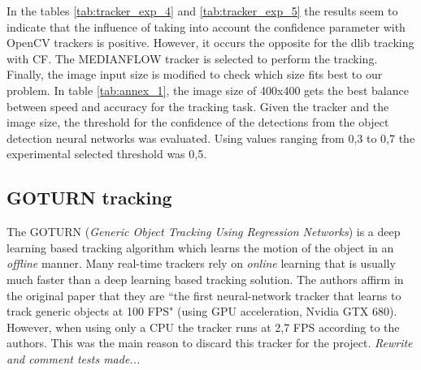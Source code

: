 In the tables \ref{tab:tracker_exp_4} and \ref{tab:tracker_exp_5} the results seem to indicate that the influence of taking into account the confidence parameter with OpenCV trackers is positive. However, it occurs the opposite for the dlib tracking with CF. The MEDIANFLOW tracker is selected to perform the tracking.\\
Finally, the image input size is modified to check which size fits best to our problem. In table \ref{tab:annex_1}, the image size of 400x400 gets the best balance between speed and accuracy for the tracking task. Given the tracker and the image size, the threshold for the confidence of the detections from the object detection neural networks was evaluated. Using values ranging from 0,3 to 0,7 the experimental selected threshold was 0,5.
\subsection{GOTURN tracking}
The GOTURN (\textit{Generic Object Tracking Using Regression Networks}) is a deep learning based tracking algorithm which learns the motion of the object in an \textit{offline} manner. Many real-time trackers rely on \textit{online} learning that is usually much faster than a deep learning based tracking solution. The authors affirm in the original paper \cite{held2016learning} that they are ``the first neural-network tracker that learns to track generic objects at 100 FPS" (using GPU acceleration, Nvidia GTX 680). However, when using only a CPU the tracker runs at 2,7 FPS according to the authors. This was the main reason to discard this tracker for the project. \textit{Rewrite and comment tests made...} %
